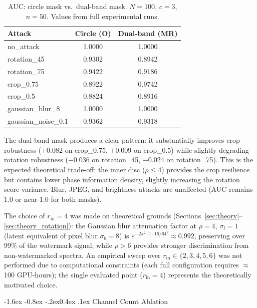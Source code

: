 \documentclass[10pt,twocolumn]{article}
\makeatletter
\renewcommand\subsection{\@startsection{subsection}{2}{\z@}%
  {-1.6ex \@plus -0.8ex \@minus -.2ex}{0.4ex \@plus .1ex}%
  {\normalfont\normalsize\itshape}}
\makeatother
\begin{document}
\begin{table}[htbp]
  \centering
  \caption{AUC: circle mask vs.\ dual-band mask.
    $N{=}100$, $c{=}3$, $n{=}50$. Values from full experimental runs.}
  \label{tab:mask_ablation}
  \setlength{\tabcolsep}{3pt}
  \small
  \begin{tabular}{lcc}
    \toprule
    \textbf{Attack} & \textbf{Circle} (O) & \textbf{Dual-band} (MR) \\
    \midrule
    no\_attack           & 1.0000 & 1.0000 \\
    rotation\_45         & 0.9302 & 0.8942 \\
    rotation\_75         & 0.9422 & 0.9186 \\
    crop\_0.75           & 0.8922 & 0.9742 \\
    crop\_0.5            & 0.8824 & 0.8916 \\
    gaussian\_blur\_8    & 1.0000 & 1.0000 \\
    gaussian\_noise\_0.1 & 0.9362 & 0.9318 \\
    \bottomrule
  \end{tabular}
\end{table}

The dual-band mask produces a clear pattern: it substantially improves
crop robustness ($+$0.082 on crop\_0.75, $+$0.009 on crop\_0.5) while
slightly degrading rotation robustness ($-$0.036 on rotation\_45,
$-$0.024 on rotation\_75).
This is the expected theoretical trade-off: the inner disc
($\rho \le 4$) provides the crop resilience but contains lower phase
information density, slightly increasing the rotation score variance.
Blur, JPEG, and brightness attacks are unaffected (AUC remains 1.0
or near-1.0 for both masks).

The choice of $r_{\mathrm{in}}{=}4$ was made on theoretical grounds
(Sections~\ref{sec:theory}--\ref{sec:theory_rotation}): the
Gaussian blur attenuation factor at $\rho{=}4$, $\sigma_l{=}1$
(latent equivalent of pixel blur $\sigma_b{=}8$) is
$e^{-2\pi^2 \cdot 1 \cdot 16 / 64^2} \approx 0.992$, preserving
over 99\% of the watermark signal, while $\rho > 6$ provides stronger
discrimination from non-watermarked spectra.
An empirical sweep over $r_{\mathrm{in}} \in \{2,3,4,5,6\}$ was not
performed due to computational constraints (each full configuration
requires $\approx$100 GPU-hours); the single evaluated point
($r_{\mathrm{in}}{=}4$) represents the theoretically motivated choice.

\subsection{Channel Count Ablation}
\end{document}

